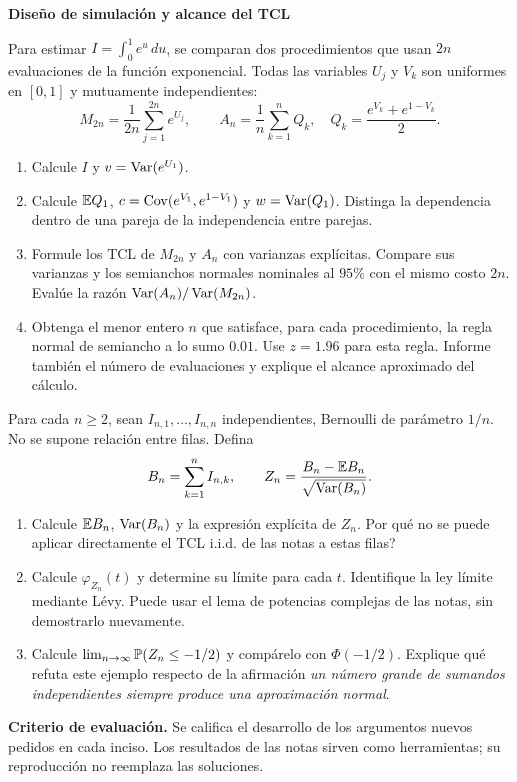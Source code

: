 \newpage
{\Large\bfseries\color{uni}Diseño de simulación y alcance del TCL}\par
{}
Para estimar $I=\int_0^1e^u\,du$, se comparan dos procedimientos que usan $2n$ evaluaciones de la función exponencial. Todas las variables $U_j$ y $V_k$ son uniformes en $[0,1]$ y mutuamente independientes:
\[
M_{2n}=\frac1{2n}\sum_{j=1}^{2n}e^{U_j},\qquad
A_n=\frac1n\sum_{k=1}^n Q_k,\quad
Q_k=\frac{e^{V_k}+e^{1-V_k}}{2}.
\]
\begin{enumerate}
\item Calcule $I$ y $v=\operatorname{Var}(e^{U_1})$. 
\item Calcule $\mathbb E Q_1$, $c=\operatorname{Cov}(e^{V_1},e^{1-V_1})$ y $w=\operatorname{Var}(Q_1)$. Distinga la dependencia dentro de una pareja de la independencia entre parejas. 
\item Formule los TCL de $M_{2n}$ y $A_n$ con varianzas explícitas. Compare sus varianzas y los semianchos normales nominales al $95\%$ con el mismo costo $2n$. Evalúe la razón $\operatorname{Var}(A_n)/\operatorname{Var}(M_{2n})$. 
\item Obtenga el menor entero $n$ que satisface, para cada procedimiento, la regla normal de semiancho a lo sumo $0.01$. Use $z=1.96$ para esta regla. Informe también el número de evaluaciones y explique el alcance aproximado del cálculo. 
\end{enumerate}

Para cada $n\ge2$, sean $I_{n,1},\ldots,I_{n,n}$ independientes, Bernoulli de parámetro $1/n$. No se supone relación entre filas. Defina
\[
B_n=\sum_{k=1}^nI_{n,k},\qquad
Z_n=\frac{B_n-\mathbb E B_n}{\sqrt{\operatorname{Var}(B_n)}}.
\]
\begin{enumerate}
\item Calcule $\mathbb E B_n$, $\operatorname{Var}(B_n)$ y la expresión explícita de $Z_n$. \textquestiondown{}Por qué no se puede aplicar directamente el TCL i.i.d. de las notas a estas filas? 
\item Calcule $\varphi_{Z_n}(t)$ y determine su límite para cada $t$. Identifique la ley límite mediante Lévy. Puede usar el lema de potencias complejas de las notas, sin demostrarlo nuevamente. 
\item Calcule $\lim_{n\to\infty}\mathbb P(Z_n\le-1/2)$ y compárelo con $\Phi(-1/2)$. Explique qué refuta este ejemplo respecto de la afirmación \emph{un número grande de sumandos independientes siempre produce una aproximación normal}. 
\end{enumerate}

\vfill
{\small\textbf{Criterio de evaluación.} Se califica el desarrollo de los argumentos nuevos pedidos en cada inciso. Los resultados de las notas sirven como herramientas; su reproducción no reemplaza las soluciones.}


